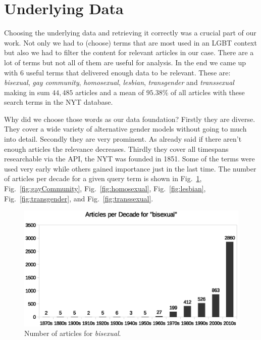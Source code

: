 \documentclass[10pt,a4paper,twocolumn]{scrartcl}
\begin{document}
\section{Underlying Data}\label{sec:underlyingdata}

Choosing the underlying data and retrieving it correctly was a crucial part of our work. Not only we had to (choose) terms that are most used in an LGBT context but also we had to filter the content for relevant articles in our case. There are a lot of terms but not all of them are useful for analysis. In the end we came up with 6 useful terms that delivered enough data to be relevant. These are: \textit{bisexual}, \textit{gay community}, \textit{homosexual}, \textit{lesbian}, \textit{transgender} and \textit{transsexual} making in sum $44,485$ articles and a mean of $95.38\%$ of all articles with these search terms in the NYT database. 

Why did we choose those words as our data foundation? Firstly they are diverse. They cover a wide variety of alternative gender models without going to much into detail. Secondly they are very prominent. As already said if there aren't enough articles the relevance decreases. Thirdly they cover all timespans researchable via the API, the NYT was founded in 1851. Some of the terms were used very early while others gained importance just in the last time. The number of articles per decade for a given query term is shown in Fig.~\ref{fig:bisexual}, Fig.~\ref{fig:gayCommunity}, Fig.~\ref{fig:homosexual}, Fig.~\ref{fig:lesbian}, Fig.~\ref{fig:transgender}, and Fig.~\ref{fig:transsexual}.


\begin{figure}
\includegraphics[width=\columnwidth]{figures/bisexual_decade}
\caption{Number of articles for \textit{bisexual}.} \label{fig:bisexual}
\end{figure}
\end{document}
